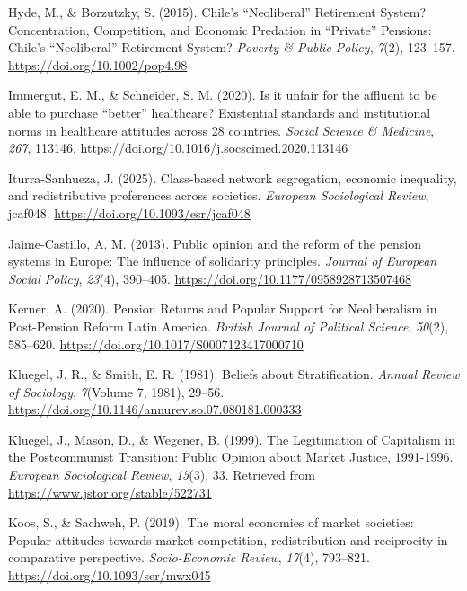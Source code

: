 \documentclass[
  12pt,
]{article}
\newlength{\cslhangindent}
\newenvironment{CSLReferences}[2] %
 {\begin{list}{}{%
  \setlength{\itemindent}{0pt}
  \setlength{\leftmargin}{0pt}
  \setlength{\parsep}{0pt}
  \ifodd #1
   \setlength{\leftmargin}{\cslhangindent}
   \setlength{\itemindent}{-1\cslhangindent}
  \fi
  \setlength{\itemsep}{#2\baselineskip}}}
 {\end{list}}
\begin{document}
\begin{CSLReferences}{1}{0}
Hyde, M., \& Borzutzky, S. (2015). Chile's {``{Neoliberal}''}
{Retirement System}? {Concentration}, {Competition}, and {Economic
Predation} in {``{Private}''} {Pensions}: {Chile}'s {``{Neoliberal}''}
{Retirement System}? \emph{Poverty \& Public Policy}, \emph{7}(2),
123--157. \url{https://doi.org/10.1002/pop4.98}

Immergut, E. M., \& Schneider, S. M. (2020). Is it unfair for the
affluent to be able to purchase {``better''} healthcare? {Existential}
standards and institutional norms in healthcare attitudes across 28
countries. \emph{Social Science \& Medicine}, \emph{267}, 113146.
\url{https://doi.org/10.1016/j.socscimed.2020.113146}

Iturra-Sanhueza, J. (2025). Class-based network segregation, economic
inequality, and redistributive preferences across societies.
\emph{European Sociological Review}, jcaf048.
\url{https://doi.org/10.1093/esr/jcaf048}

Jaime-Castillo, A. M. (2013). Public opinion and the reform of the
pension systems in {Europe}: The influence of solidarity principles.
\emph{Journal of European Social Policy}, \emph{23}(4), 390--405.
\url{https://doi.org/10.1177/0958928713507468}

Kerner, A. (2020). Pension {Returns} and {Popular Support} for
{Neoliberalism} in {Post-Pension Reform Latin America}. \emph{British
Journal of Political Science}, \emph{50}(2), 585--620.
\url{https://doi.org/10.1017/S0007123417000710}

Kluegel, J. R., \& Smith, E. R. (1981). Beliefs about {Stratification}.
\emph{Annual Review of Sociology}, \emph{7}(Volume 7, 1981), 29--56.
\url{https://doi.org/10.1146/annurev.so.07.080181.000333}

Kluegel, J., Mason, D., \& Wegener, B. (1999). The {Legitimation} of
{Capitalism} in the {Postcommunist Transition}: {Public Opinion} about
{Market Justice}, 1991-1996. \emph{European Sociological Review},
\emph{15}(3), 33. Retrieved from
\url{https://www.jstor.org/stable/522731}

Koos, S., \& Sachweh, P. (2019). The moral economies of market
societies: Popular attitudes towards market competition, redistribution
and reciprocity in comparative perspective. \emph{Socio-Economic
Review}, \emph{17}(4), 793--821.
\url{https://doi.org/10.1093/ser/mwx045}


\end{CSLReferences}
\end{document}

